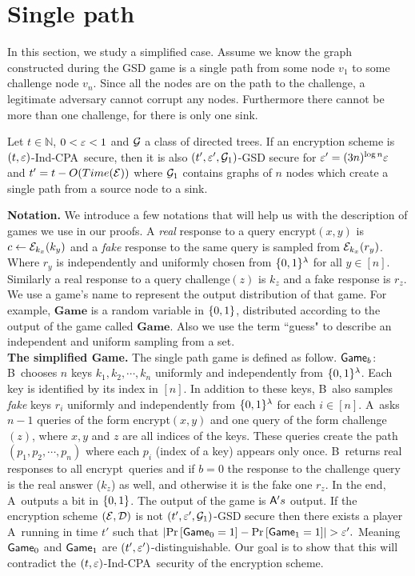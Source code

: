 \documentclass{article}
\newcommand{\tcpa}{$(t,\eps)$-Ind-CPA}
\def\B{{\sf B}}
\def\A{{\sf A}}
\def\E{{\cal E}}
\def\D{{\cal D}}
\newcommand{\encrypt}{{\sf encrypt}}
\newcommand{\game}{{\sf Game}}
\newcommand{\dgame}{{\mathbf{Game}}}
\def\challenge{{\sf challenge}}
\begin{document}
\section{Single path} %

In this section, we study a simplified case. Assume we know the graph constructed during the GSD game is a single path from some node $v_1$ to some challenge node $v_n$. Since all the nodes are on the path to the challenge, a legitimate adversary cannot corrupt any nodes. Furthermore there cannot be more than one challenge, for there is only one sink. 

\begin{theorem}\label{thm:s1in-1out}
Let $t \in \mathbb{N}$, $0<\varepsilon<1$ and ${\cal G}$ a class of directed trees. If an encryption scheme is \tcpa~secure, then it is also $(t',\varepsilon',{\cal G}_1)$-GSD secure for $\varepsilon'=(3n)^{\log n} \varepsilon $ and $t'=t-O(Time(\E))$ where ${\cal G}_1$ contains graphs of $n$ nodes which create a single path from a source node to a sink.
\end{theorem}

\noindent \textbf{Notation.} We introduce a few notations that will help us with the description of games we use in our proofs. A \textit{real} response to a query \encrypt$(x,y)$ is $c\leftarrow \E_{k_x}(k_{y})$ and a \textit{fake} response to the same query is sampled from $\E_{k_x}(r_{y})$. Where $r_y$ is independently and uniformly chosen from $\{0,1\}^\lambda$ for all $y\in [n]$. Similarly a real response to a query \challenge$(z)$ is $k_z$ and a fake response is $r_z$. We use a game's name to represent the output distribution of that game. For example, $\dgame$ is a random variable in $\{0,1\}$, distributed according to the output of the game called $\dgame$. Also we use the term ``guess" to describe an independent and uniform sampling from a set.\\

\noindent \textbf{The simplified Game.} The single path game is defined as follow. $\game_b$: \B~chooses $n$ keys $k_1,k_2,\cdots,k_n$ uniformly and independently from $\{0,1\}^\lambda$. Each key is identified by its index in $[n]$. In addition to these keys, \B~also samples \textit{fake} keys $r_i$ uniformly and independently from $\{0,1\}^\lambda$ for each $i\in [n]$. \A~asks $n-1$ queries of the form \encrypt$(x,y)$ and one query of the form \challenge$(z)$, where $x,y$ and $z$ are all indices of the keys. These queries create the path $(p_1,p_2,\cdots, p_n)$ where each $p_i$ (index of a key) appears only once.  \B~returns real responses to all \encrypt~queries and if $b=0$ the response to the challenge query is the real answer ($k_{z}$) as well, and otherwise it is the fake one $r_{z}$. In the end, \A~outputs a bit in $\{0,1\}$. The output of the game is $\A's$ output. If the encryption scheme $(\E,\D)$ is not $(t',\varepsilon',{\cal G}_1)$-GSD secure then there exists a player \A~running in time $t'$ such that
$\abs{\prob{\game_0=1}-\prob{\game_1=1}}> \eps'.$
Meaning $\game_0$ and $\game_1$ are $(t',\varepsilon')$-distinguishable. Our goal is to show that this will contradict the \tcpa~security of the encryption scheme. \\
\end{document}
